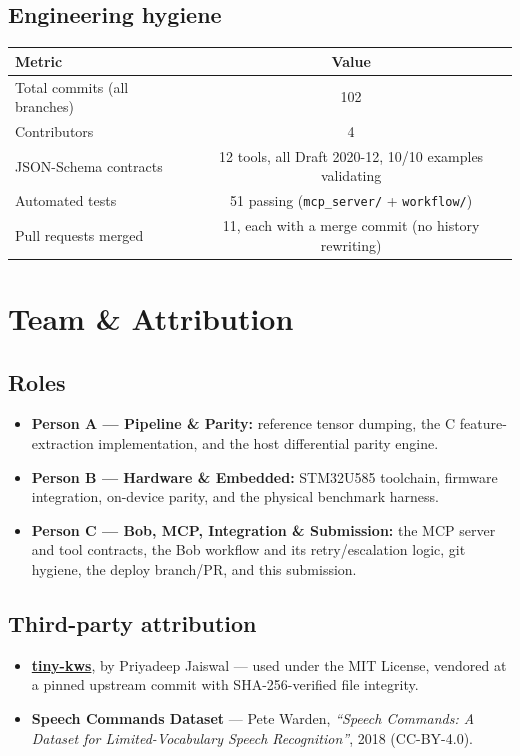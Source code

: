 \documentclass[11pt,a4paper]{article}
\begin{document}
\subsection{Engineering hygiene}
\begin{center}
\begin{tabular}{@{}lc@{}}
\toprule
\textbf{Metric} & \textbf{Value} \\
\midrule
Total commits (all branches) & 102 \\
Contributors & 4 \\
JSON-Schema contracts & 12 tools, all Draft 2020-12, 10/10 examples validating \\
Automated tests & 51 passing (\texttt{mcp\_server/} + \texttt{workflow/}) \\
Pull requests merged & 11, each with a merge commit (no history rewriting) \\
\bottomrule
\end{tabular}
\end{center}

\newpage
\section{Team \& Attribution}

\subsection{Roles}
\begin{itemize}[leftmargin=1.4em]
  \item \textbf{Person A --- Pipeline \& Parity:} reference tensor dumping,
  the C feature-extraction implementation, and the host differential
  parity engine.
  \item \textbf{Person B --- Hardware \& Embedded:} STM32U585 toolchain,
  firmware integration, on-device parity, and the physical benchmark
  harness.
  \item \textbf{Person C --- Bob, MCP, Integration \& Submission:} the MCP
  server and tool contracts, the Bob workflow and its retry/escalation
  logic, git hygiene, the deploy branch/PR, and this submission.
\end{itemize}

\subsection{Third-party attribution}
\begin{itemize}[leftmargin=1.4em]
  \item \textbf{\href{https://github.com/priyadeepjaiswal9c/tiny-kws}{tiny-kws}},
  by Priyadeep Jaiswal --- used under the MIT License, vendored at a pinned
  upstream commit with SHA-256-verified file integrity.
  \item \textbf{Speech Commands Dataset} --- Pete Warden, \emph{``Speech
  Commands: A Dataset for Limited-Vocabulary Speech Recognition''}, 2018
  (CC-BY-4.0).
\end{itemize}
\end{document}
